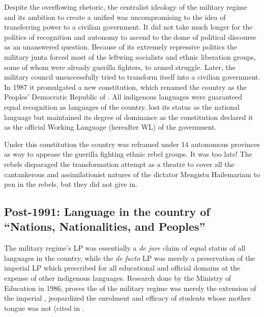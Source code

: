 \documentclass[output=paper,modfonts]{langscibook}
\begin{document}
Despite the overflowing rhetoric, the centralist ideology of the military regime and its ambition to create a unified  was uncompromising to the idea of transferring power to a civilian government. It did not take much longer for the politics of recognition and autonomy to ascend to the dome of political discourse as an unanswered question. Because of its extremely repressive politics the military junta forced most of the leftwing socialists and ethnic liberation groups, some of whom were already guerilla fighters, to armed struggle. Later, the military council unsuccessfully tried to transform itself into a civilian government. In 1987  it promulgated a new constitution, which renamed the country as the Peoples’ Democratic Republic of . All indigenous languages were guaranteed equal recognition as languages of the country.  lost its status as the national language but maintained its degree of dominance as the constitution declared it as the official Working Language (hereafter WL) of the government. 

Under this constitution the country was reframed under 14 autonomous provinces as way to appease the guerilla fighting ethnic rebel groups. It was too late! The rebels disparaged the transformation attempt as a theatre to cover all the cantankerous and assimilationist natures of the dictator Mengistu Hailemariam to pen in the rebels, but they did not give in.
 
\subsection{Post-1991: Language in the country of “Nations, Nationalities, and Peoples”}
 
The military regime’s LP was essentially a \textit{de jure} claim of equal status of all languages in the country, while the \textit{de facto} LP was merely a preservation of the imperial LP which prescribed  for all educational and official domains at the expense of other indigenous languages. Research done by the Ministry of Education in 1986, proves the  of the military regime was merely the extension of the imperial , jeopardized the enrolment and efficacy of students whose mother tongue was not  (cited in \citealt{HeughEtAl2007}. 
\end{document}

